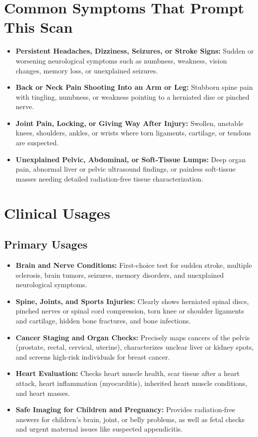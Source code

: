 \section{Common Symptoms That Prompt This Scan}
\begin{itemize}
\item \textbf{Persistent Headaches, Dizziness, Seizures, or Stroke Signs:} Sudden or worsening neurological symptoms such as numbness, weakness, vision changes, memory loss, or unexplained seizures.
\item \textbf{Back or Neck Pain Shooting Into an Arm or Leg:} Stubborn spine pain with tingling, numbness, or weakness pointing to a herniated disc or pinched nerve.
\item \textbf{Joint Pain, Locking, or Giving Way After Injury:} Swollen, unstable knees, shoulders, ankles, or wrists where torn ligaments, cartilage, or tendons are suspected.
\item \textbf{Unexplained Pelvic, Abdominal, or Soft-Tissue Lumps:} Deep organ pain, abnormal liver or pelvic ultrasound findings, or painless soft-tissue masses needing detailed radiation-free tissue characterization.
\end{itemize}

\section{Clinical Usages}

\subsection{Primary Usages}
\begin{itemize}
\item \textbf{Brain and Nerve Conditions:} First-choice test for sudden stroke, multiple sclerosis, brain tumors, seizures, memory disorders, and unexplained neurological symptoms.
\item \textbf{Spine, Joints, and Sports Injuries:} Clearly shows herniated spinal discs, pinched nerves or spinal cord compression, torn knee or shoulder ligaments and cartilage, hidden bone fractures, and bone infections.
\item \textbf{Cancer Staging and Organ Checks:} Precisely maps cancers of the pelvis (prostate, rectal, cervical, uterine), characterizes unclear liver or kidney spots, and screens high-risk individuals for breast cancer.
\item \textbf{Heart Evaluation:} Checks heart muscle health, scar tissue after a heart attack, heart inflammation (myocarditis), inherited heart muscle conditions, and heart masses.
\item \textbf{Safe Imaging for Children and Pregnancy:} Provides radiation-free answers for children's brain, joint, or belly problems, as well as fetal checks and urgent maternal issues like suspected appendicitis.
\end{itemize}

